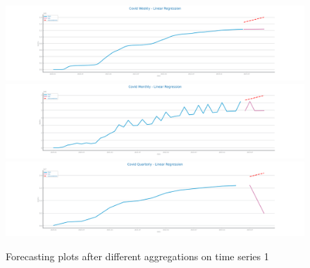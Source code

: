 \documentclass[10pt]{extarticle}
\begin{document}
\begin{figure}[H]
\centering\includegraphics[scale=0.4]{images/dataset1/time_series/Covid Weekly - Linear Regression_forecasting_series.png}
\includegraphics[scale=0.4]{images/dataset1/time_series/Covid Monthly - Linear Regression_forecasting_series.png}
\includegraphics[scale=0.4]{images/dataset1/time_series/Covid Quarterly - Linear Regression_forecasting_series.png}
\caption{Forecasting plots after different aggregations on time series 1}
\end{figure}
\end{document}
